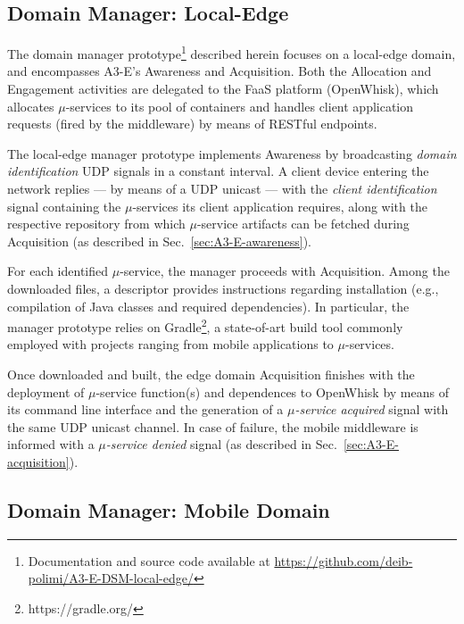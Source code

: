 \subsection{Domain Manager: Local-Edge}\label{sec:local-edge-domain-DSM}


The domain manager prototype\footnote{Documentation and source code available at \url{https://github.com/deib-polimi/A3-E-DSM-local-edge/}} described herein focuses on a local-edge domain, and encompasses A3-E's Awareness and Acquisition. Both the Allocation and Engagement activities are delegated to the FaaS platform (OpenWhisk), which allocates $\mu$-services to its pool of containers and handles client application requests (fired by the middleware) by means of RESTful endpoints.

The local-edge manager prototype implements Awareness by broadcasting \textit{domain identification} UDP signals in a constant interval. A client device entering the network replies --- by means of a UDP unicast --- with the \textit{client identification} signal containing the $\mu$-services its client application requires, along with the respective repository from which $\mu$-service artifacts can be fetched during Acquisition (as described in Sec.~\ref{sec:A3-E-awareness}). 

For each identified $\mu$-service, the manager proceeds with Acquisition. Among the downloaded files, a descriptor provides instructions regarding installation (e.g., compilation of Java classes and required dependencies). In particular, the manager prototype relies on Gradle\footnote{https://gradle.org/}, a state-of-art build tool commonly employed with projects ranging from mobile applications to $\mu$-services.

Once downloaded and built, the edge domain Acquisition finishes with the deployment of $\mu$-service function(s) and dependences to OpenWhisk by means of its command line interface and the generation of a \textit{$\mu$-service acquired} signal with the same UDP unicast channel. In case of failure, the mobile middleware is informed with a \textit{$\mu$-service denied} signal (as described in Sec.~\ref{sec:A3-E-acquisition}).

\subsection{Domain Manager: Mobile Domain}\label{sec:mobile-domain-DSM}

